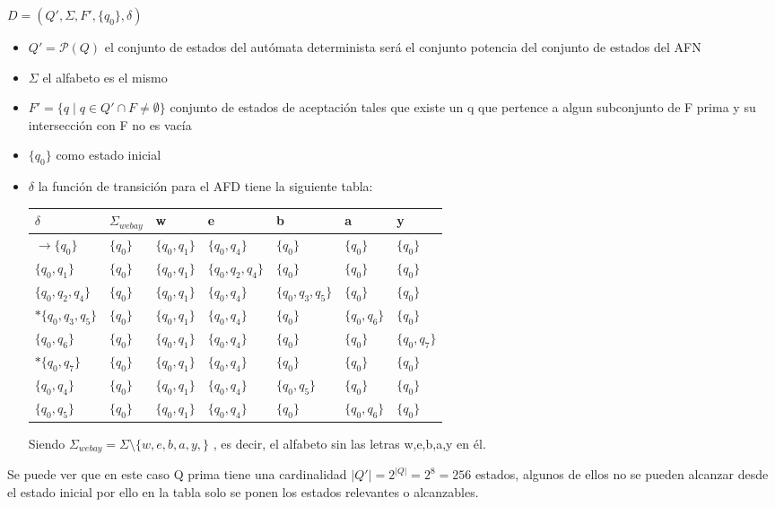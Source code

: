 \documentclass[spanish]{article}
\begin{document}
\begin{center}
$ D = (Q \prime ,\Sigma,F \prime,\{ q_{0} \} ,\delta) $
\begin{itemize}
\item{ 
$ Q \prime = \mathcal{P}(Q) $ el conjunto de estados del autómata determinista será el conjunto potencia del conjunto de estados del AFN
}

\item{
$ \Sigma $ el alfabeto es el mismo
}

\item{
$ F \prime = \{ q \mid q \in Q \prime \cap F \neq \emptyset \} $ conjunto de estados de aceptación tales que existe un q que pertence a algun subconjunto de F prima y su intersección con F no es vacía
}
\item{
$ \{ q_{0} \} $ como estado inicial
}
\item{
$ \delta $ la función de transición para el AFD tiene la siguiente tabla:\hfill \break

\begin{table}[H]
\begin{tabular}{l|llllll}
$\delta$ & $\Sigma_{webay}$ & w & e & b & a & y  \\ \hline
$\rightarrow \{q_{0}\}$   &   $\{q_{0}\} $    & $\{q_{0},q_{1}\}$  & $\{q_{0},q_{4}\}$   & $\{q_{0}\} $   & $\{q_{0}\} $   & $\{q_{0}\} $ \\
$\{q_{0},q_{1}\}$  &   $\{q_{0}\} $    & $\{q_{0},q_{1}\}$  & $\{q_{0},q_{2},q_{4}\}$  & $\{q_{0}\} $  &  $\{q_{0}\} $ &  $\{q_{0}\} $ \\
$\{q_{0},q_{2},q_{4}\}$    &   $\{q_{0}\} $    & $\{q_{0},q_{1}\}$ & $\{q_{0},q_{4}\}$  & $ \{q_{0},q_{3},q_{5}\}$  &  $\{q_{0}\} $ &  $\{q_{0}\} $  \\
$* \{q_{0},q_{3},q_{5}\}$    &   $\{q_{0}\} $    & $\{q_{0},q_{1}\}$  & $\{q_{0},q_{4}\}$  & $\{q_{0}\}$  &  $\{q_{0},q_{6}\}$  &  $\{q_{0}\} $  \\
$\{q_{0},q_{6}\}$    &   $\{q_{0}\} $    & $\{q_{0},q_{1}\}$ & $\{q_{0},q_{4}\}$  & $\{q_{0}\}$  &  $\{q_{0}\} $ &  $ \{q_{0},q_{7}\}$  \\
$* \{q_{0},q_{7}\}$   &   $\{q_{0}\} $    & $\{q_{0},q_{1}\}$  & $\{q_{0},q_{4}\}$  & $\{q_{0}\} $  &  $\{q_{0}\} $ &  $\{q_{0}\} $  \\
$\{q_{0},q_{4}\}$    &   $\{q_{0}\} $    & $\{q_{0},q_{1}\}$  & $\{q_{0},q_{4}\}$   & $\{q_{0},q_{5}\}$  & $\{q_{0}\} $  & $\{q_{0}\} $    \\ 
$\{q_{0},q_{5}\}$ &   $\{q_{0}\} $    & $\{q_{0},q_{1}\}$  & $\{q_{0},q_{4}\}$ & $\{q_{0}\}$ &  $\{q_{0},q_{6}\}$ & $\{q_{0}\}$
\end{tabular}
\end{table}
Siendo $\Sigma_{webay} = \Sigma \setminus \{ w, e, b, a, y, \} $ , es decir, el alfabeto sin las letras w,e,b,a,y en él.
}
\end{itemize}
\end{center}  
Se puede ver que en este caso Q prima tiene una cardinalidad $ \vert Q \prime \vert  = 2^{\vert Q \vert} = 2^8 = 256 $ estados, algunos de ellos no se pueden alcanzar desde el estado inicial por ello en la tabla solo se ponen los estados relevantes o alcanzables. 
\end{document}
